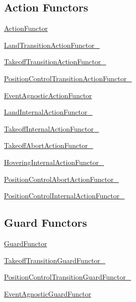 \subsection*{Action Functors}


\begin{DoxyItemize}
\item \hyperlink{structActionFunctor}{Action\-Functor}
\begin{DoxyItemize}
\item \hyperlink{structLandTransitionActionFunctor__}{Land\-Transition\-Action\-Functor\-\_\-}
\item \hyperlink{structTakeoffTransitionActionFunctor__}{Takeoff\-Transition\-Action\-Functor\-\_\-}
\item \hyperlink{structPositionControlTransitionActionFunctor__}{Position\-Control\-Transition\-Action\-Functor\-\_\-}
\end{DoxyItemize}
\item \hyperlink{structEventAgnosticActionFunctor}{Event\-Agnostic\-Action\-Functor}
\begin{DoxyItemize}
\item \hyperlink{structLandInternalActionFunctor__}{Land\-Internal\-Action\-Functor\-\_\-}
\item \hyperlink{structTakeoffInternalActionFunctor__}{Takeoff\-Internal\-Action\-Functor\-\_\-}
\item \hyperlink{structTakeoffAbortActionFunctor__}{Takeoff\-Abort\-Action\-Functor\-\_\-}
\item \hyperlink{structHoveringInternalActionFunctor__}{Hovering\-Internal\-Action\-Functor\-\_\-}
\item \hyperlink{structPositionControlAbortActionFunctor__}{Position\-Control\-Abort\-Action\-Functor\-\_\-}
\item \hyperlink{structPositionControlInternalActionFunctor__}{Position\-Control\-Internal\-Action\-Functor\-\_\-}
\end{DoxyItemize}
\end{DoxyItemize}

\subsection*{Guard Functors}


\begin{DoxyItemize}
\item \hyperlink{structGuardFunctor}{Guard\-Functor}
\begin{DoxyItemize}
\item \hyperlink{structTakeoffTransitionGuardFunctor__}{Takeoff\-Transition\-Guard\-Functor\-\_\-}
\item \hyperlink{structPositionControlTransitionGuardFunctor__}{Position\-Control\-Transition\-Guard\-Functor\-\_\-}
\end{DoxyItemize}
\item \hyperlink{structEventAgnosticGuardFunctor}{Event\-Agnostic\-Guard\-Functor}
\end{DoxyItemize}

